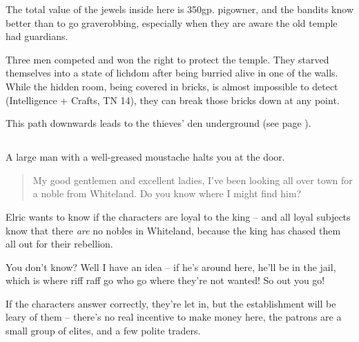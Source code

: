 The total value of the jewels inside here is 350gp.  \Gls{pigowner}, and the bandits know better than to go graverobbing, especially when they are aware the old temple had guardians.

Three men competed and won the right to protect the temple.  They starved themselves into a state of lichdom after being burried alive in one of the walls.  While the hidden room, being covered in bricks, is almost impossible to detect (Intelligence + Crafts, TN 14), they can break those bricks down at any point.


\demilich

This path downwards leads to the thieves' den underground (see page \pageref{pigexit}).

\subsection{}


\setcounter{list}{0}


\begin{boxtext}
	A large man with a well-greased moustache halts you at the door.

	\begin{quotation}

		My good gentlemen and excellent ladies, I've been looking all over town for a noble from Whiteland.  Do you know where I might find him?

	\end{quotation}

\end{boxtext}

Elric wants to know if the characters are loyal to the king -- and all loyal subjects know that there \emph{are} no nobles in Whiteland, because the king has chased them all out for their rebellion.

\begin{speechtext}

	You don't know?  Well I have an idea -- if he's around here, he'll be in the jail, which is where riff raff go who go where they're not wanted!  So out you go!

\end{speechtext}

If the characters answer correctly, they're let in, but the establishment will be leary of them -- there's no real incentive to make money here, the patrons are a small group of elites, and a few polite traders.

